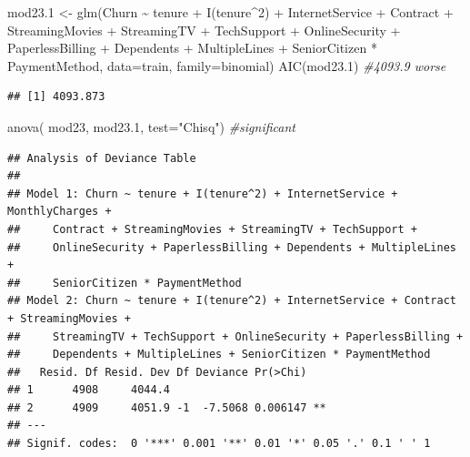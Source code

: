 \documentclass[
  twoside]{article}
\newenvironment{Shaded}{\begin{snugshade}}{\end{snugshade}}
\newcommand{\AttributeTok}[1]{\textcolor[rgb]{0.77,0.63,0.00}{#1}}
\newcommand{\CommentTok}[1]{\textcolor[rgb]{0.56,0.35,0.01}{\textit{#1}}}
\newcommand{\DecValTok}[1]{\textcolor[rgb]{0.00,0.00,0.81}{#1}}
\newcommand{\FloatTok}[1]{\textcolor[rgb]{0.00,0.00,0.81}{#1}}
\newcommand{\FunctionTok}[1]{\textcolor[rgb]{0.00,0.00,0.00}{#1}}
\newcommand{\NormalTok}[1]{#1}
\newcommand{\OtherTok}[1]{\textcolor[rgb]{0.56,0.35,0.01}{#1}}
\newcommand{\SpecialCharTok}[1]{\textcolor[rgb]{0.00,0.00,0.00}{#1}}
\newcommand{\StringTok}[1]{\textcolor[rgb]{0.31,0.60,0.02}{#1}}
\begin{document}
\begin{Shaded}
\begin{Highlighting}[]
\NormalTok{mod23}\FloatTok{.1} \OtherTok{\textless{}{-}} \FunctionTok{glm}\NormalTok{(Churn }\SpecialCharTok{\textasciitilde{}}\NormalTok{ tenure }\SpecialCharTok{+} \FunctionTok{I}\NormalTok{(tenure}\SpecialCharTok{\^{}}\DecValTok{2}\NormalTok{) }\SpecialCharTok{+}\NormalTok{ InternetService }\SpecialCharTok{+}\NormalTok{ Contract }\SpecialCharTok{+} 
\NormalTok{                 StreamingMovies }\SpecialCharTok{+}\NormalTok{ StreamingTV }\SpecialCharTok{+}\NormalTok{ TechSupport }\SpecialCharTok{+}\NormalTok{ OnlineSecurity }\SpecialCharTok{+} 
\NormalTok{                 PaperlessBilling }\SpecialCharTok{+}\NormalTok{ Dependents }\SpecialCharTok{+}\NormalTok{ MultipleLines }\SpecialCharTok{+} 
\NormalTok{                 SeniorCitizen }\SpecialCharTok{*}\NormalTok{ PaymentMethod, }\AttributeTok{data=}\NormalTok{train, }\AttributeTok{family=}\NormalTok{binomial)}
\FunctionTok{AIC}\NormalTok{(mod23}\FloatTok{.1}\NormalTok{) }\CommentTok{\#4093.9 worse}
\end{Highlighting}
\end{Shaded}

\begin{verbatim}
## [1] 4093.873
\end{verbatim}

\begin{Shaded}
\begin{Highlighting}[]
\FunctionTok{anova}\NormalTok{( mod23, mod23}\FloatTok{.1}\NormalTok{,  }\AttributeTok{test=}\StringTok{"Chisq"}\NormalTok{) }\CommentTok{\#significant}
\end{Highlighting}
\end{Shaded}

\begin{verbatim}
## Analysis of Deviance Table
## 
## Model 1: Churn ~ tenure + I(tenure^2) + InternetService + MonthlyCharges + 
##     Contract + StreamingMovies + StreamingTV + TechSupport + 
##     OnlineSecurity + PaperlessBilling + Dependents + MultipleLines + 
##     SeniorCitizen * PaymentMethod
## Model 2: Churn ~ tenure + I(tenure^2) + InternetService + Contract + StreamingMovies + 
##     StreamingTV + TechSupport + OnlineSecurity + PaperlessBilling + 
##     Dependents + MultipleLines + SeniorCitizen * PaymentMethod
##   Resid. Df Resid. Dev Df Deviance Pr(>Chi)   
## 1      4908     4044.4                        
## 2      4909     4051.9 -1  -7.5068 0.006147 **
## ---
## Signif. codes:  0 '***' 0.001 '**' 0.01 '*' 0.05 '.' 0.1 ' ' 1
\end{verbatim}
\end{document}

